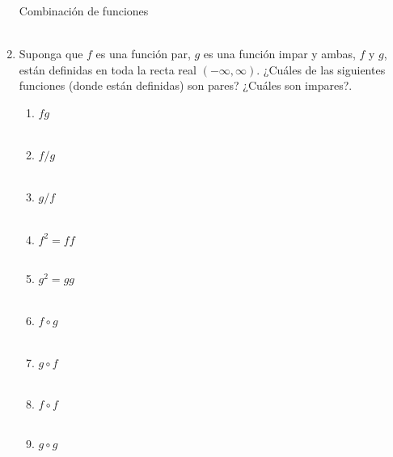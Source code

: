 \begin{enumerate}
Combinación de funciones\\\\

\item Suponga que $f$ es una función par, $g$ es una función impar y ambas, $f$ y $g$, están definidas en toda la recta real $(-\infty, \infty)$. ¿Cuáles de las siguientes funciones (donde están definidas) son pares? ¿Cuáles son impares?.
    \begin{enumerate}[\bfseries a)]

	\item $fg$\\\\

	\item $f/g$\\\\

	\item $g/f$\\\\

	\item $f^2 = ff$\\\\

	\item $g^2 = gg$\\\\

	\item $f\circ g$\\\\

	\item $g\circ f$\\\\

	\item $f\circ f$\\\\

	\item $g\circ g$\\\\

    \end{enumerate}

\end{enumerate}

